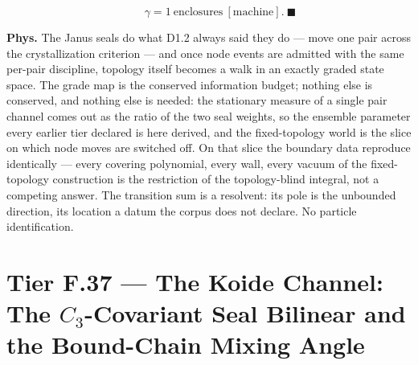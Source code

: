 \begin{theorem}
\[
\qquad \gamma=1\ \text{enclosures}\ [\text{machine}].\ \blacksquare
\]

\textbf{Phys.} The Janus seals do what D1.2 always said they do — move one pair across the crystallization criterion — and once node events are admitted with the same per-pair discipline, topology itself becomes a walk in an exactly graded state space. The grade map is the conserved information budget; nothing else is conserved, and nothing else is needed: the stationary measure of a single pair channel comes out as the ratio of the two seal weights, so the ensemble parameter every earlier tier declared is here derived, and the fixed-topology world is the slice on which node moves are switched off. On that slice the boundary data reproduce identically — every covering polynomial, every wall, every vacuum of the fixed-topology construction is the restriction of the topology-blind integral, not a competing answer. The transition sum is a resolvent: its pole is the unbounded direction, its location a datum the corpus does not declare. No particle identification.

\end{theorem}

\section[Tier F.37 — The Koide Channel: The -Covariant Seal Bilinear…]{\texorpdfstring{Tier F.37 — The Koide Channel: The $C_3$-Covariant Seal Bilinear and the Bound-Chain Mixing Angle}{Tier F.37 - The Koide Channel: The -Covariant Seal Bilinear and the Bound-Chain Mixing Angle}}

